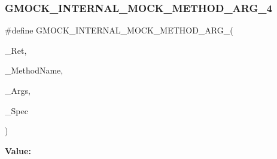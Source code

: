 \subsubsection{\texorpdfstring{GMOCK\_INTERNAL\_MOCK\_METHOD\_ARG\_4}{GMOCK\_INTERNAL\_MOCK\_METHOD\_ARG\_4}}
{\footnotesize\ttfamily \#define G\+M\+O\+C\+K\+\_\+\+I\+N\+T\+E\+R\+N\+A\+L\+\_\+\+M\+O\+C\+K\+\_\+\+M\+E\+T\+H\+O\+D\+\_\+\+A\+R\+G\+\_(\begin{DoxyParamCaption}\item[{}]{\+\_\+\+Ret,  }\item[{}]{\+\_\+\+Method\+Name,  }\item[{}]{\+\_\+\+Args,  }\item[{}]{\+\_\+\+Spec }\end{DoxyParamCaption})}

{\bfseries Value\+:}
